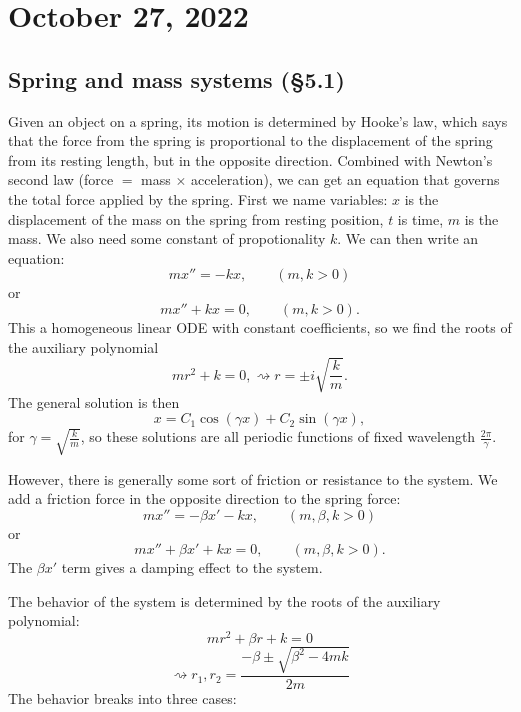 \documentclass[12pt]{amsart}
\numberwithin{equation}{section}
\theoremstyle{plain} %
\newcommand{\Oct}[1]{\section{October #1, 2022}}
\newcommand{\rsa}{\rightsquigarrow}
\theoremstyle{definition}
\theoremstyle{remark}
\begin{document}
\Oct{27}

\subsection{Spring and mass systems (\S5.1)}

Given an object on a spring, its motion is determined by Hooke's law, which says that the force from the spring is proportional to the displacement of the spring from its resting length, but in the opposite direction. Combined with Newton's second law (force $=$ mass $\times$ acceleration), we can get an equation that governs the total force applied by the spring. First we name variables:
$x$ is the displacement of the mass on the spring from resting position, $t$ is time, $m$ is the mass. We also need some constant of propotionality $k$. We can then write an equation:
\[ m x'' = - k x, \qquad (m,k>0) \]
 or
\[ m x'' + k x = 0,  \qquad (m,k>0). \]
This a homogeneous linear ODE with constant coefficients, so we find the roots of the auxiliary polynomial
\[ m r^2 + k = 0, \rsa r = \pm i \sqrt{\frac{k}{m}}.\]
The general solution is then
\[ x = C_1 \cos(\gamma x) + C_2 \sin(\gamma x),\]
for $\gamma= \sqrt{ \frac{k}{m} }$, so these solutions are all periodic functions of fixed wavelength $\frac{2 \pi}{\gamma}$.

However, there is generally some sort of friction or resistance to the system. We add a friction force in the opposite direction to the spring force:
\[ m x'' = - \beta x' - k x, \qquad (m,\beta,k>0)\]
or
\[ m x'' + \beta x' + k x = 0, \qquad (m,\beta,k>0).\]
The $\beta x'$ term gives a damping effect to the system.

The behavior of the system is determined by the roots of the auxiliary polynomial:
\[ m r^2 + \beta r + k  = 0\]
\[\rsa r_1,r_2= \frac{ - \beta \pm \sqrt{\beta^2- 4 m k }}{2 m}\]
The behavior breaks into three cases:
\end{document}
